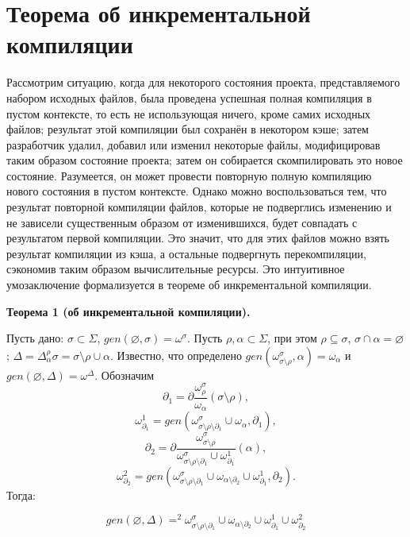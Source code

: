 \section{Теорема об инкрементальной компиляции}

Рассмотрим ситуацию, когда для некоторого состояния проекта, представляемого набором исходных файлов, была проведена успешная полная компиляция в пустом контексте, то есть не использующая ничего, кроме самих исходных файлов; результат этой компиляции был сохранён в некотором кэше; затем разработчик удалил, добавил или изменил некоторые файлы, модифицировав таким образом состояние проекта; затем он собирается скомпилировать это новое состояние. Разумеется, он может провести повторную полную компиляцию нового состояния в пустом контексте. Однако можно воспользоваться тем, что результат повторной компиляции файлов, которые не подверглись изменению и не зависели существенным образом от изменившихся, будет совпадать с результатом первой компиляции. Это значит, что для этих файлов можно взять результат компиляции из кэша, а остальные подвергнуть перекомпиляции, сэкономив таким образом вычислительные ресурсы. Это интуитивное умозаключение формализуется в теореме об инкрементальной компиляции.\\

\newcommand{\butpartial}{{\sigma\setminus\rho\setminus\partial_1}}
\newcommand{\butpartialA}{{\alpha\setminus{\partial_2}}}
\newcommand{\sigmanoro}{{\sigma\setminus\rho}}

\textbf{Теорема 1 (об инкрементальной компиляции).}

Пусть дано: $\sigma \subset \Sigma$, $gen(\varnothing, \sigma) = \omega^\sigma$.
Пусть $\rho, \alpha \subset \Sigma$, при этом $\rho \subseteq \sigma$, $\sigma \cap \alpha = \varnothing$; $\Delta = \Delta^\rho_\alpha\sigma = \sigma\setminus\rho\cup\alpha$.
Известно, что определено $gen(\omega^\sigma_{\sigma\setminus\rho}, \alpha) = \omega_\alpha$ и $gen(\varnothing, \Delta) = \omega^\Delta$.
Обозначим 
$$\partial_1 = \partial\dfrac{\omega^\sigma_\rho}{\omega_\alpha}(\sigma\setminus\rho),$$
$$\omega^1_{\partial_1} = gen(\omega^\sigma_{\butpartial} \cup \omega_\alpha, \partial_1),$$
$$\partial_2 = \partial\dfrac{\omega^\sigma_{\sigma\setminus\rho}}{\omega^\sigma_{\butpartial} \cup \omega^1_{\partial_1}}(\alpha),$$
$$\omega^2_{\partial_2} = gen(\omega^\sigma_{\butpartial} \cup \omega_{\butpartialA} \cup \omega^1_{\partial_1}, \partial_2).$$
Тогда:

$$gen(\varnothing, \Delta) =^2 \omega^\sigma_{\butpartial} \cup \omega_{\butpartialA} \cup \omega^1_{\partial_1} \cup \omega^2_{\partial_2}$$

